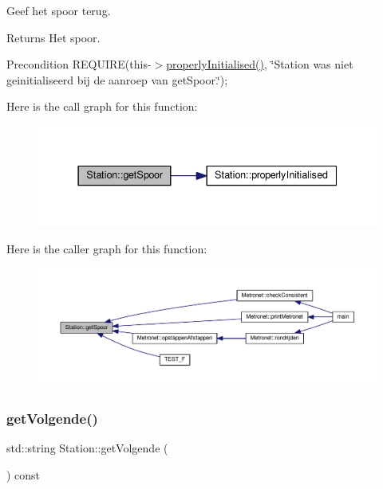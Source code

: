 Geef het spoor terug. 

\begin{DoxyReturn}{Returns}
Het spoor. 
\end{DoxyReturn}
\begin{DoxyPrecond}{Precondition}
R\+E\+Q\+U\+I\+RE(this-\/$>$\hyperlink{class_station_a9ce626dd0599e3ea8107404a59c21e16}{properly\+Initialised()}, \char`\"{}\+Station was niet geinitialiseerd bij de aanroep van get\+Spoor.\char`\"{}); 
\end{DoxyPrecond}
Here is the call graph for this function\+:\nopagebreak
\begin{figure}[H]
\begin{center}
\leavevmode
\includegraphics[width=337pt]{class_station_a081ca6373631199a30ebab56f50022d8_cgraph}
\end{center}
\end{figure}
Here is the caller graph for this function\+:\nopagebreak
\begin{figure}[H]
\begin{center}
\leavevmode
\includegraphics[width=350pt]{class_station_a081ca6373631199a30ebab56f50022d8_icgraph}
\end{center}
\end{figure}
\mbox{\label{class_station_a1c9f9e7d77d74e7b06bf627bcb2c0067}} 
\subsubsection{\texorpdfstring{get\+Volgende()}{getVolgende()}}
{\footnotesize\ttfamily std\+::string Station\+::get\+Volgende (\begin{DoxyParamCaption}{ }\end{DoxyParamCaption}) const}



